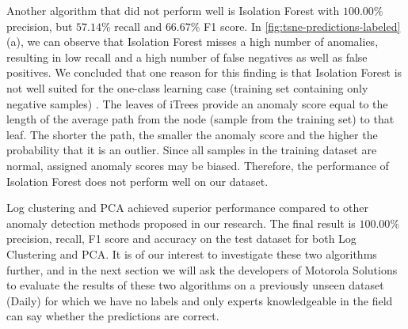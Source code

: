 Another algorithm that did not perform well is Isolation Forest with $100.00\%$ precision, but $57.14\%$ recall and $66.67\%$ F1 score. In \ref{fig:tsne-predictions-labeled} (a), we can observe that Isolation Forest misses a high number of anomalies, resulting in low recall and a high number of false negatives as well as false positives. We concluded that one reason for this finding is that Isolation Forest is not well suited for the one-class learning case (training set containing only negative samples) \cite{adForest}. The leaves of iTrees provide an anomaly score equal to the length of the average path from the node (sample from the training set) to that leaf. The shorter the path, the smaller the anomaly score and the higher the probability that it is an outlier. Since all samples in the training dataset are normal, assigned anomaly scores may be biased. Therefore, the performance of Isolation Forest does not perform well on our dataset.

Log clustering and PCA achieved superior performance compared to other anomaly detection methods proposed in our research. The final result is $100.00\%$ precision, recall, F1 score and accuracy on the test dataset for both Log Clustering and PCA. It is of our interest to investigate these two algorithms further, and in the next section we will ask the developers of Motorola Solutions to evaluate the results of these two algorithms on a previously unseen dataset (Daily) for which we have no labels and only experts knowledgeable in the field can say whether the predictions are correct.  


